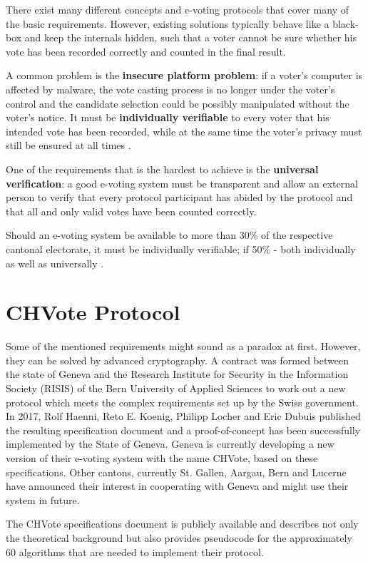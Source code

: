 There exist many different concepts and e-voting protocols that cover many of the basic requirements. However, existing solutions typically behave like a black-box and keep the internals hidden, such that a voter cannot be sure whether his vote has been recorded correctly and counted in the final result.

A common problem is the \textbf{insecure platform problem}: if a voter's computer is affected by malware, the vote casting process is no longer under the voter's control and the candidate selection could be possibly manipulated without the voter's notice. It must be \textbf{individually verifiable} to every voter that his intended vote has been recorded, while at the same time the voter's privacy must still be ensured at all times \cite{chvote}.

One of the requirements that is the hardest to achieve is the \textbf{universal verification}: a good e-voting system must be transparent and allow an external person to verify that every protocol participant has abided by the protocol and that all and only valid votes have been counted correctly.

Should an e-voting system be available to more than 30\% of the respective cantonal electorate, it must be individually verifiable; if 50\% - both individually as well as universally \cite{evotinganforderungen}.

\section{CHVote Protocol}
Some of the mentioned requirements might sound as a paradox at first. However, they can be solved by advanced cryptography. A contract was formed between the state of Geneva and the  Research Institute for Security in the Information Society (RISIS) of the Bern University of Applied Sciences to work out a new protocol which meets the complex requirements set up by the Swiss government. In 2017, Rolf Haenni, Reto E. Koenig, Philipp Locher and Eric Dubuis published the resulting specification document and a proof-of-concept has been successfully implemented by the State of Geneva. Geneva is currently developing a new version of their e-voting system with the name CHVote, based on these specifications. Other cantons, currently St. Gallen, Aargau, Bern and Lucerne have announced their interest in cooperating with Geneva and might use their system in future.

The CHVote specifications document is publicly available and describes not only the theoretical background but also provides pseudocode for the approximately 60 algorithms that are needed to implement their protocol.

